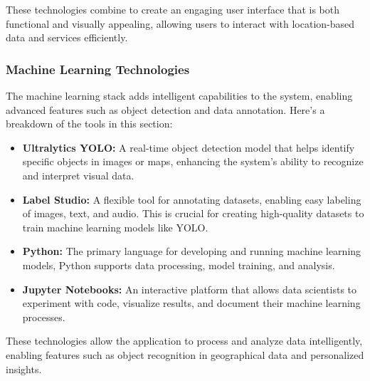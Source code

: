 These technologies combine to create an engaging user interface that is both functional and visually appealing, allowing users to interact with location{-}based data and services efficiently.

\subsubsection{Machine Learning Technologies}

The machine learning stack adds intelligent capabilities to the system, enabling advanced features such as object detection and data annotation. Here’s a breakdown of the tools in this section:

\begin{itemize}
    \item{} \textbf{Ultralytics YOLO:} A real{-}time object detection model that helps identify specific objects in images or maps, enhancing the system's ability to recognize and interpret visual data.
    \item{} \textbf{Label Studio:} A flexible tool for annotating datasets, enabling easy labeling of images, text, and audio. This is crucial for creating high{-}quality datasets to train machine learning models like YOLO\@.
    \item{} \textbf{Python:} The primary language for developing and running machine learning models, Python supports data processing, model training, and analysis.
    \item{} \textbf{Jupyter Notebooks:} An interactive platform that allows data scientists to experiment with code, visualize results, and document their machine learning processes.
\end{itemize}

These technologies allow the application to process and analyze data intelligently, enabling features such as object recognition in geographical data and personalized insights.